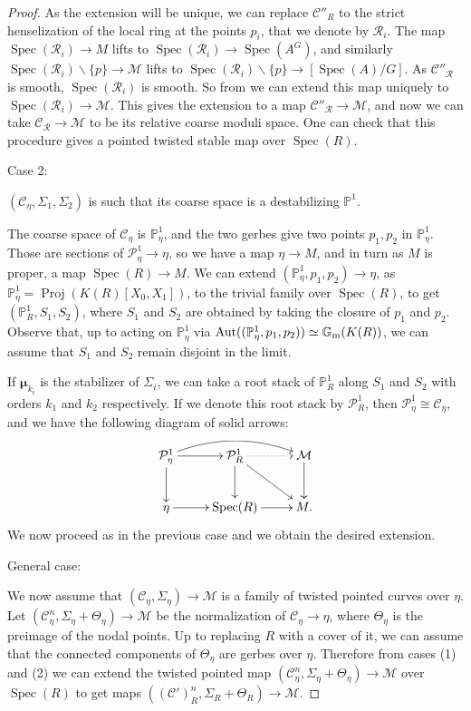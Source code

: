 \documentclass{amsart}
\newcommand{\bG}{\mathbb{G}}
\newcommand{\bP}{\mathbb{P}}
\newcommand{\cC}{\mathcal{C}}
\newcommand{\cM}{\mathcal{M}}
\newcommand{\cP}{\mathcal{P}}
\newcommand{\cR}{\mathcal{R}}
\newcommand{\spec}{\operatorname{Spec}}
\newcommand{\Gm}{\bG_{{\rm m}}}
\newcommand{\GL}{\operatorname{GL}}
\newcommand{\bmu}{\bm{\mu}}
\theoremstyle{definition}
\begin{document}
\begin{proof}
As the extension will be unique, we can replace $\cC''_R$ to the strict henselization of the local ring at the points $p_i$, that we denote by $\cR_i$.
The map $\spec(\cR_i)\to M$ lifts to $\spec(\cR_i)\to \spec(A^G)$, and similarly $\spec(\cR_i)\smallsetminus\{p\}\to \cM$ lifts to $\spec(\cR_i)\smallsetminus \{p\}\to [\spec(A)/G]$. As $\cC''_{\cR}$ is smooth, $\spec(\cR_i)$ is smooth. So from  we can extend this map uniquely to $\spec(\cR_i)\to \cM$. This gives the extension to a map $\cC''_{\cR}\to \cM$, and now we can take $\cC_{\cR}\to \cM$ to be its relative coarse moduli space. One can check that this procedure gives a pointed twisted stable map over $\spec(R)$.

\begin{bf}Case 2: \end{bf} $(\cC_\eta, \Sigma_1,\Sigma_2)$ is such that its coarse space is a destabilizing $\bP^1$.

The coarse space of $\cC_\eta$ is $\bP^1_\eta$, and the two gerbes give two points $p_1,p_2$ in $\bP^1_\eta$. Those are sections of $\cP^1_\eta\to \eta$, so
we have a map $\eta\to M$, and in turn as $M$ is proper, a map $\spec(R)\to M$. We can extend $(\bP^1_\eta, p_1,p_2)\to\eta$, as $\bP^1_\eta = \operatorname{Proj}(K(R)[X_0,X_1])$, to the trivial family over $\spec(R)$, to get $(\bP^1_R,S_1,S_2)$, where $S_1$ and $S_2$ are obtained by taking the closure of $p_1$ and $p_2$. Observe that, up to acting on $\bP^1_ \eta$ via $\operatorname{Aut}((\bP^1_\eta,p_1,p_2))\simeq \Gm(K(R))$, we can assume that $S_1$ and $S_2$ remain disjoint in the limit.

If $\bmu_{k_i}$ is the stabilizer of $\Sigma_i$, we can take a root stack of $\bP^1_R$
along $S_1$ and $S_2$ with orders $k_1$ and $k_2$ respectively. If we denote this root stack by $\cP^1_R$, then $\cP^1_\eta \cong \cC_\eta$, and we have the following diagram of solid arrows:

$$\xymatrix{\cP^1_\eta \ar[d]\ar[r]\ar@/^1pc/[rr] & \cP^1_R\ar[d]\ar[rd] \ar@{..>}[r]& \cM\ar[d]\\ \eta\ar[r] & \spec(R)\ar[r]& M.}$$
We now proceed as in the previous case and we obtain the desired extension.

\begin{bf}General case:\end{bf} We now assume that $(\cC_\eta,\Sigma_\eta)\to \cM$ is a family of twisted pointed curves over $\eta$. Let $(\cC_\eta^n,\Sigma_\eta + \Theta_\eta)\to \cM$ be the normalization of $\cC_\eta \to \eta$, where $\Theta_\eta$ is the preimage of the nodal points. Up to replacing $R$ with a cover of it, we can assume that the connected components of $\Theta_\eta$ are gerbes over $\eta$. Therefore from cases (1) and (2) we can extend the twisted pointed map $(\cC_\eta^n,\Sigma_\eta + \Theta_\eta)\to \cM$ over $\spec(R)$ to get maps $((\cC')^n_R,\Sigma_R + \Theta_R)\to \cM$. 


\end{proof}
\end{document}
